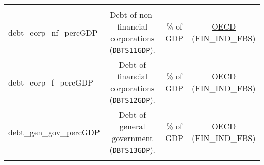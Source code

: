 \documentclass[]{article}
\begin{document}
\begin{longtable}[]{@{}lccc@{}}
\begin{minipage}[t]{0.15\columnwidth}
\end{minipage}\tabularnewline
\begin{minipage}[t]{0.14\columnwidth}\raggedright\strut
debt\_corp\_nf\_percGDP\strut
\end{minipage} & \begin{minipage}[t]{0.36\columnwidth}\centering\strut
Debt of non-financial corporations (\texttt{DBTS11GDP}).\strut
\end{minipage} & \begin{minipage}[t]{0.24\columnwidth}\centering\strut
\% of GDP\strut
\end{minipage} & \begin{minipage}[t]{0.15\columnwidth}\centering\strut
\href{https://stats.oecd.org/Index.aspx?DataSetCode=FIN_IND_FBS}{OECD
(FIN\_IND\_FBS)}\strut
\end{minipage}\tabularnewline
\begin{minipage}[t]{0.14\columnwidth}\raggedright\strut
debt\_corp\_f\_percGDP\strut
\end{minipage} & \begin{minipage}[t]{0.36\columnwidth}\centering\strut
Debt of financial corporations (\texttt{DBTS12GDP}).\strut
\end{minipage} & \begin{minipage}[t]{0.24\columnwidth}\centering\strut
\% of GDP\strut
\end{minipage} & \begin{minipage}[t]{0.15\columnwidth}\centering\strut
\href{https://stats.oecd.org/Index.aspx?DataSetCode=FIN_IND_FBS}{OECD
(FIN\_IND\_FBS)}\strut
\end{minipage}\tabularnewline
\begin{minipage}[t]{0.14\columnwidth}\raggedright\strut
debt\_gen\_gov\_percGDP\strut
\end{minipage} & \begin{minipage}[t]{0.36\columnwidth}\centering\strut
Debt of general government (\texttt{DBTS13GDP}).\strut
\end{minipage} & \begin{minipage}[t]{0.24\columnwidth}\centering\strut
\% of GDP\strut
\end{minipage} & \begin{minipage}[t]{0.15\columnwidth}\centering\strut
\href{https://stats.oecd.org/Index.aspx?DataSetCode=FIN_IND_FBS}{OECD
(FIN\_IND\_FBS)}\strut
\end{minipage}\tabularnewline
\begin{minipage}[t]{0.14\columnwidth}\raggedright\strut

\end{minipage}
\end{longtable}
\end{document}
